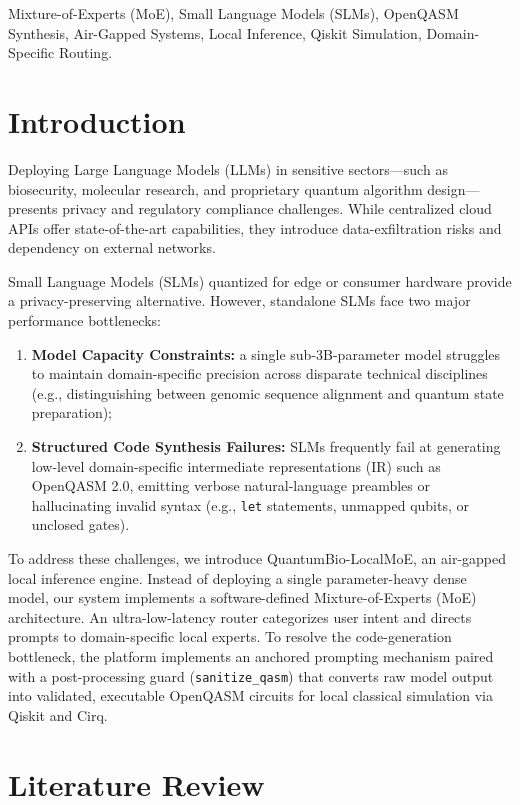 \documentclass[journal]{IEEEtran}
\begin{document}
\begin{IEEEkeywords}
Mixture-of-Experts (MoE), Small Language Models (SLMs), OpenQASM Synthesis,
Air-Gapped Systems, Local Inference, Qiskit Simulation, Domain-Specific Routing.
\end{IEEEkeywords}

\section{Introduction}
Deploying Large Language Models (LLMs) in sensitive sectors---such as
biosecurity, molecular research, and proprietary quantum algorithm design---presents
privacy and regulatory compliance challenges. While centralized cloud APIs offer
state-of-the-art capabilities, they introduce data-exfiltration risks and
dependency on external networks.

Small Language Models (SLMs) quantized for edge or consumer hardware provide a
privacy-preserving alternative. However, standalone SLMs face two major
performance bottlenecks:
\begin{enumerate}
\item \textbf{Model Capacity Constraints:} a single sub-3B-parameter model
struggles to maintain domain-specific precision across disparate technical
disciplines (e.g., distinguishing between genomic sequence alignment and quantum
state preparation);
\item \textbf{Structured Code Synthesis Failures:} SLMs frequently fail at
generating low-level domain-specific intermediate representations (IR) such as
OpenQASM 2.0, emitting verbose natural-language preambles or hallucinating
invalid syntax (e.g., \texttt{let} statements, unmapped qubits, or unclosed
gates).
\end{enumerate}

To address these challenges, we introduce QuantumBio-LocalMoE, an air-gapped
local inference engine. Instead of deploying a single parameter-heavy dense
model, our system implements a software-defined Mixture-of-Experts (MoE)
architecture. An ultra-low-latency router categorizes user intent and directs
prompts to domain-specific local experts. To resolve the code-generation
bottleneck, the platform implements an anchored prompting mechanism paired with
a post-processing guard (\texttt{sanitize\_qasm}) that converts raw model output
into validated, executable OpenQASM circuits for local classical simulation via
Qiskit and Cirq.

\section{Literature Review}
\end{document}
